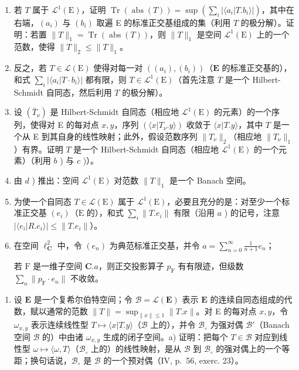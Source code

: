 \begin{enumerate}
\def\labelenumi{\alph{enumi})}
\setcounter{enumi}{1}
\item
  若 \(T\) 属于 \(\mathcal{L}^1 (\mathrm{E})\)，证明 \(\operatorname {Tr}(\operatorname {abs}(T)) = \sup (\sum_i |\langle a_i | T.b_i\rangle |)\)，其中在右端，\((a_{i})\) 与 \((b_{i})\) 取遍 E 的标准正交基组成的集（利用 \(T\) 的极分解）。证明：若置 \(\| T\| _1 = \operatorname {Tr}(\operatorname {abs}(T))\)，则 \(\| T\| _1\) 是空间 \(\mathcal{L}^1 (\mathrm{E})\) 上的一个范数，使得 \(\| T\| _2\leqslant \| T\| _1\)。
\item
  反之，若 \(T \in \mathcal{L}(\mathrm{E})\) 使得对每一对 \(((a_i), (b_i))\)（\(\mathbf{E}\) 的标准正交基的），和式 \(\sum_{i} |\langle a_i | T \cdot b_i \rangle|\) 都有限，则 \(T \in \mathcal{L}^1(\mathrm{E})\)（首先注意 \(T\) 是一个 Hilbert-Schmidt 自同态，然后利用 \(T\) 的极分解）。
\item
  设 \((\bar{T}_{\nu})\) 是 Hilbert-Schmidt 自同态（相应地 \(\mathcal{L}^1 (\mathrm{E})\) 的元素）的一个序列，使得对 E 的每对点 \(x,y\)，序列 \((\langle x|T_{\nu}.y\rangle)\) 收敛于 \(\langle x|T.y\rangle\)，其中 \(T\) 是一个从 E 到其自身的线性映射；此外，假设范数序列 \(\| T_{\nu}\| _2\)（相应地 \(\| T_{\nu}\| _1\)）有界。证明 \(T\) 是一个 Hilbert-Schmidt 自同态（相应地 \(\mathcal{L}^1 (\mathrm{E})\) 的一个元素）（利用 \(b\) ) 与 \(c\) )）。
\item
  由 \(d\) ) 推出：空间 \(\mathcal{L}^1 (\mathrm{E})\) 对范数 \(\| T\| _1\) 是一个 Banach 空间。
\item
  为使一个自同态 \(T \in \mathcal{L}(\mathrm{E})\) 属于 \(\mathcal{L}^1(\mathrm{E})\)，必要且充分的是：对至少一个标准正交基 \((e_i)\)（\(\mathrm{E}\) 的），和式 \(\sum_{i} \| T.e_i\|\) 有限（沿用 \(a\) ) 的记号，注意 \(|\langle e_i|R.e_i\rangle| \leqslant \| T.e_i\|\)）。

\item
  在空间 \(\ell_{\mathbf{C}}^2\) 中，令 \((e_n)\) 为典范标准正交基，并令 \(a = \sum_{n=0}^{\infty} \frac{1}{n+1} e_n\)；

若 \(\mathrm{F}\) 是一维子空间 \(\mathbf{C}.a\)，则正交投影算子 \(p_{\mathrm{F}}\) 有有限迹，但级数 \(\sum_{n}\| p_{\mathrm{F}}\cdot e_n\|\) 不收敛。
\end{enumerate}

\begin{enumerate}
\def\labelenumi{\arabic{enumi})}
\setcounter{enumi}{14}
\tightlist
\item
  设 \(\mathbf{E}\) 是一个复希尔伯特空间；令 \(\mathcal{B} = \mathcal{L}(\mathbf{E})\) 表示 \(\mathbf{E}\) 的连续自同态组成的代数，赋以通常的范数 \(\| T\| = \sup_{\| x\| \leqslant 1}\| T.x\|\)。对 E 的每对点 \(x, y\)，令 \(\omega_{x,y}\) 表示连续线性型 \(T \mapsto \langle x|T.y \rangle\)（\(\mathcal{B}\) 上的），并令 \(\mathcal{B}_{\circ}\) 为强对偶 \(\mathcal{B}'\)（Banach 空间 \(\mathcal{B}\) 的）中由诸 \(\omega_{x,y}\) 生成的闭子空间。a) 证明：把每个 \(T \in \mathcal{B}\) 对应到线性型 \(\omega \mapsto \langle \omega, T \rangle\)（\(\mathcal{B}_{\circ}\) 上的）的线性映射，是从 \(\mathcal{B}\) 到 \(\mathcal{B}_{\circ}\) 的强对偶上的一个等距；换句话说，\(\mathcal{B}_{\circ}\) 是 \(\mathcal{B}\) 的一个预对偶（IV, p.~56, exerc. 23）。
\end{enumerate}

